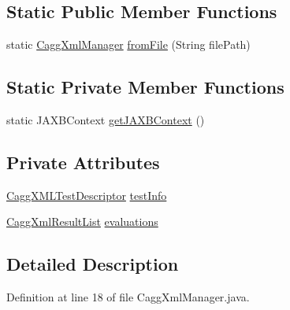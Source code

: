 \subsection*{Static Public Member Functions}
\begin{DoxyCompactItemize}
\item 
static \hyperlink{classit_1_1emarolab_1_1cagg_1_1debugging_1_1result2XML_1_1CaggXmlManager}{Cagg\-Xml\-Manager} \hyperlink{classit_1_1emarolab_1_1cagg_1_1debugging_1_1result2XML_1_1CaggXmlManager_a46c3a801b96c6cc1053839c828a0e576}{from\-File} (String file\-Path)
\end{DoxyCompactItemize}
\subsection*{Static Private Member Functions}
\begin{DoxyCompactItemize}
\item 
static J\-A\-X\-B\-Context \hyperlink{classit_1_1emarolab_1_1cagg_1_1debugging_1_1result2XML_1_1CaggXmlManager_a13966bdebf19c3214dc95e46b6260fa4}{get\-J\-A\-X\-B\-Context} ()
\end{DoxyCompactItemize}
\subsection*{Private Attributes}
\begin{DoxyCompactItemize}
\item 
\hyperlink{classit_1_1emarolab_1_1cagg_1_1debugging_1_1result2XML_1_1CaggXMLTestDescriptor}{Cagg\-X\-M\-L\-Test\-Descriptor} \hyperlink{classit_1_1emarolab_1_1cagg_1_1debugging_1_1result2XML_1_1CaggXmlManager_a948e0f592c4ea1660d89774f630f589e}{test\-Info}
\item 
\hyperlink{classit_1_1emarolab_1_1cagg_1_1debugging_1_1result2XML_1_1CaggXmlResultList}{Cagg\-Xml\-Result\-List} \hyperlink{classit_1_1emarolab_1_1cagg_1_1debugging_1_1result2XML_1_1CaggXmlManager_ac479f51b98651331c0404db366242a69}{evaluations}
\end{DoxyCompactItemize}


\subsection{Detailed Description}


Definition at line 18 of file Cagg\-Xml\-Manager.\-java.



